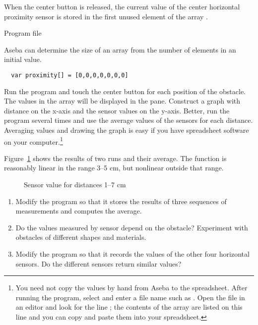 
When the center button is released, the current value of the center
horizontal proximity sensor is stored in the first unused element of the
array .


{\raggedleft \hfill Program file }

Aseba can determine the size of an array from the number of elements in
an initial value.

\begin{verbatim}
  var proximity[] = [0,0,0,0,0,0,0]
\end{verbatim}


Run the program and touch the center button for each position of the
obstacle. The values in the array  will be displayed in the
 pane. Construct a graph with distance on the x-axis and
the sensor values on the y-axis. Better, run the program several times
and use the average values of the sensors for each distance. Averaging
values and drawing the graph is easy if you have spreadsheet software on
your computer.\footnote{You need not copy the values by hand from Aseba
to the spreadsheet. After running the program, select  and enter a file name such as . Open the
file  in an editor and look for the line
; the contents of the array are listed on this
line and you can copy and paste them into your spreadsheet.}

Figure~\ref{fig.nonlinear} shows the results of two runs and their
average. The function is reasonably linear in the range 3--5 cm, but
nonlinear outside that range.


\begin{figure}
\caption{Sensor value for distances 1--7 cm}\label{fig.nonlinear}
\end{figure}


\begin{enumerate}
\item Modify the program so that it stores the results of three
sequences of measurements and computes the average.

\item Do the values measured by sensor depend on the obstacle?
Experiment with obstacles of different shapes and materials.

\item Modify the program so that it records the values of the other four
horizontal sensors. Do the different sensors return similar values?
 
\end{enumerate}



